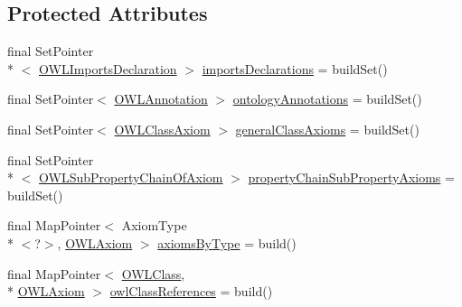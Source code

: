 \subsection*{Protected Attributes}
\begin{DoxyCompactItemize}
\item 
final Set\-Pointer\\*
$<$ \hyperlink{interfaceorg_1_1semanticweb_1_1owlapi_1_1model_1_1_o_w_l_imports_declaration}{O\-W\-L\-Imports\-Declaration} $>$ \hyperlink{classuk_1_1ac_1_1manchester_1_1cs_1_1owl_1_1owlapi_1_1_internals_impl_a953f0cfc52da41dc46bfe01b4efefc07}{imports\-Declarations} = build\-Set()
\item 
final Set\-Pointer$<$ \hyperlink{interfaceorg_1_1semanticweb_1_1owlapi_1_1model_1_1_o_w_l_annotation}{O\-W\-L\-Annotation} $>$ \hyperlink{classuk_1_1ac_1_1manchester_1_1cs_1_1owl_1_1owlapi_1_1_internals_impl_a84be33ecc613604c70d3526198bf9467}{ontology\-Annotations} = build\-Set()
\item 
final Set\-Pointer$<$ \hyperlink{interfaceorg_1_1semanticweb_1_1owlapi_1_1model_1_1_o_w_l_class_axiom}{O\-W\-L\-Class\-Axiom} $>$ \hyperlink{classuk_1_1ac_1_1manchester_1_1cs_1_1owl_1_1owlapi_1_1_internals_impl_a91b70e34408f2f059e5c8592a4bc6544}{general\-Class\-Axioms} = build\-Set()
\item 
final Set\-Pointer\\*
$<$ \hyperlink{interfaceorg_1_1semanticweb_1_1owlapi_1_1model_1_1_o_w_l_sub_property_chain_of_axiom}{O\-W\-L\-Sub\-Property\-Chain\-Of\-Axiom} $>$ \hyperlink{classuk_1_1ac_1_1manchester_1_1cs_1_1owl_1_1owlapi_1_1_internals_impl_a0f97044cc915ecbf6cda0522ade7223b}{property\-Chain\-Sub\-Property\-Axioms} = build\-Set()
\item 
final Map\-Pointer$<$ Axiom\-Type\\*
$<$?$>$, \hyperlink{interfaceorg_1_1semanticweb_1_1owlapi_1_1model_1_1_o_w_l_axiom}{O\-W\-L\-Axiom} $>$ \hyperlink{classuk_1_1ac_1_1manchester_1_1cs_1_1owl_1_1owlapi_1_1_internals_impl_ad55369810bfffa95448b6f222519cfea}{axioms\-By\-Type} = build()
\item 
final Map\-Pointer$<$ \hyperlink{interfaceorg_1_1semanticweb_1_1owlapi_1_1model_1_1_o_w_l_class}{O\-W\-L\-Class}, \\*
\hyperlink{interfaceorg_1_1semanticweb_1_1owlapi_1_1model_1_1_o_w_l_axiom}{O\-W\-L\-Axiom} $>$ \hyperlink{classuk_1_1ac_1_1manchester_1_1cs_1_1owl_1_1owlapi_1_1_internals_impl_a14741c2971c61162d2f1b34bbc0cbe4c}{owl\-Class\-References} = build()
\item 

\end{DoxyCompactItemize}
